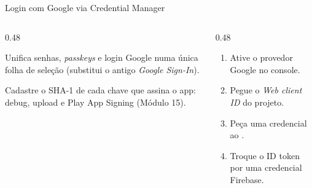 \documentclass[aspectratio=169,10pt]{beamer}
\begin{document}
\begin{frame}{Login com Google via Credential Manager}
  \begin{center}
  \end{center}
  \begin{columns}[T]
    \begin{column}{0.48\textwidth}
      \begin{conceito}
        Unifica senhas, \emph{passkeys} e login Google numa única folha de seleção (substitui o antigo \emph{Google Sign-In}).
      \end{conceito}
      \begin{atencao}
        Cadastre o SHA-1 de cada chave que assina o app: debug, upload e Play App Signing (Módulo 15).
      \end{atencao}
    \end{column}
    \begin{column}{0.48\textwidth}
      \begin{dica}[Passos]
        \begin{enumerate}
          \item Ative o provedor Google no console.
          \item Pegue o \emph{Web client ID} do projeto.
          \item Peça uma credencial  ao .
          \item Troque o ID token por uma credencial Firebase.
        \end{enumerate}
      \end{dica}
    \end{column}
  \end{columns}
\end{frame}
\end{document}

